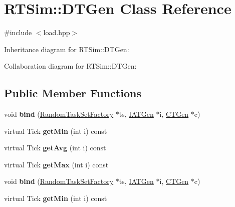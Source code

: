 \hypertarget{classRTSim_1_1DTGen}{}\section{R\+T\+Sim\+:\+:D\+T\+Gen Class Reference}
\label{classRTSim_1_1DTGen}


{\ttfamily \#include $<$load.\+hpp$>$}



Inheritance diagram for R\+T\+Sim\+:\+:D\+T\+Gen\+:


Collaboration diagram for R\+T\+Sim\+:\+:D\+T\+Gen\+:
\subsection*{Public Member Functions}
\begin{DoxyCompactItemize}
\item 
void {\bfseries bind} (\hyperlink{classRTSim_1_1RandomTaskSetFactory}{Random\+Task\+Set\+Factory} $\ast$ts, \hyperlink{classRTSim_1_1IATGen}{I\+A\+T\+Gen} $\ast$i, \hyperlink{classRTSim_1_1CTGen}{C\+T\+Gen} $\ast$c)\hypertarget{classRTSim_1_1DTGen_a4d11dc37e061bba0fcd80f633d7a6ca2}{}\label{classRTSim_1_1DTGen_a4d11dc37e061bba0fcd80f633d7a6ca2}

\item 
virtual Tick {\bfseries get\+Min} (int i) const \hypertarget{classRTSim_1_1DTGen_ae563abe8964f02b96b5e03edf3c7f4ad}{}\label{classRTSim_1_1DTGen_ae563abe8964f02b96b5e03edf3c7f4ad}

\item 
virtual Tick {\bfseries get\+Avg} (int i) const \hypertarget{classRTSim_1_1DTGen_a869e4cb63acd95b8d9752ae3cd01aa7a}{}\label{classRTSim_1_1DTGen_a869e4cb63acd95b8d9752ae3cd01aa7a}

\item 
virtual Tick {\bfseries get\+Max} (int i) const \hypertarget{classRTSim_1_1DTGen_a37f662065d96b5fafc272fb5a2097785}{}\label{classRTSim_1_1DTGen_a37f662065d96b5fafc272fb5a2097785}

\item 
void {\bfseries bind} (\hyperlink{classRTSim_1_1RandomTaskSetFactory}{Random\+Task\+Set\+Factory} $\ast$ts, \hyperlink{classRTSim_1_1IATGen}{I\+A\+T\+Gen} $\ast$i, \hyperlink{classRTSim_1_1CTGen}{C\+T\+Gen} $\ast$c)\hypertarget{classRTSim_1_1DTGen_a4d11dc37e061bba0fcd80f633d7a6ca2}{}\label{classRTSim_1_1DTGen_a4d11dc37e061bba0fcd80f633d7a6ca2}

\item 
virtual Tick {\bfseries get\+Min} (int i) const \hypertarget{classRTSim_1_1DTGen_ac98c79a9f19af8fdb74091d96bb9e39b}{}\label{classRTSim_1_1DTGen_ac98c79a9f19af8fdb74091d96bb9e39b}


\end{DoxyCompactItemize}
